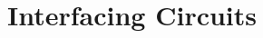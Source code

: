 \documentclass[../../main]{subfiles}
\begin{document}
\section{Interfacing Circuits} \label{sec:}
\end{document}
